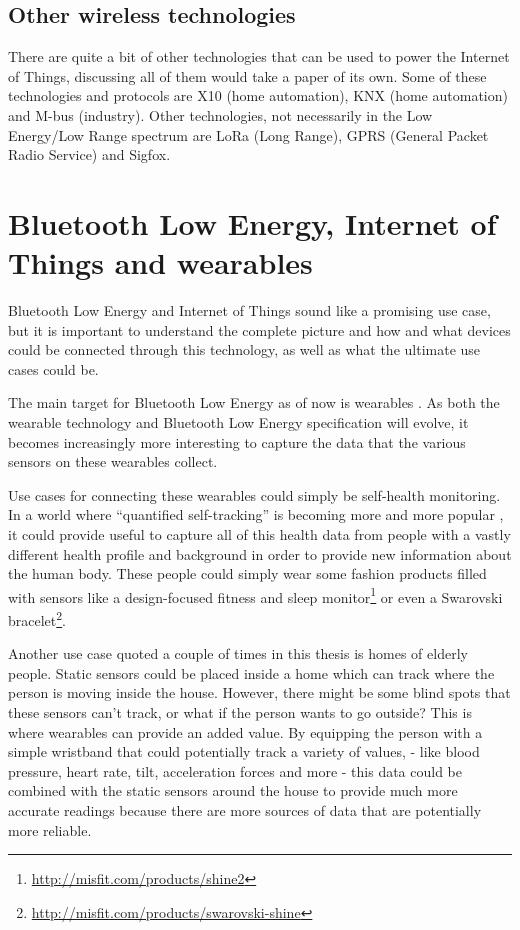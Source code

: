 \documentclass[pdftex,a4paper,12pt,twoside]{report}
\begin{document}
\subsection{Other wireless technologies}
\label{subsec:othertechnologies}
There are quite a bit of other technologies that can be used to power the Internet of Things, discussing all of them would take a paper of its own. Some of these technologies and protocols are X10 (home automation), KNX (home automation) and M-bus (industry). Other technologies, not necessarily in the Low Energy/Low Range spectrum are LoRa (Long Range), GPRS (General Packet Radio Service) and Sigfox.

\section{Bluetooth Low Energy, Internet of Things and wearables}
\label{sec:bleiotwearables}
Bluetooth Low Energy and Internet of Things sound like a promising use case, but it is important to understand the complete picture and how and what devices could be connected through this technology, as well as what the ultimate use cases could be.

The main target for Bluetooth Low Energy as of now is wearables \citep{blakesnow2016}. As both the wearable technology and Bluetooth Low Energy specification will evolve, it becomes increasingly more interesting to capture the data that the various sensors on these wearables collect.

Use cases for connecting these wearables could simply be self-health monitoring. In a world where ``quantified self-tracking'' is becoming more and more popular \citep{swan2012sensor}, it could provide useful to capture all of this health data from people with a vastly different health profile and background in order to provide new information about the human body. These people could simply wear some fashion products filled with sensors like a design-focused fitness and sleep monitor\footnote{\url{http://misfit.com/products/shine2}} or even a Swarovski bracelet\footnote{\url{http://misfit.com/products/swarovski-shine}}.

Another use case quoted a couple of times in this thesis is homes of elderly people. Static sensors could be placed inside a home which can track where the person is moving inside the house. However, there might be some blind spots that these sensors can't track, or what if the person wants to go outside? This is where wearables can provide an added value. By equipping the person with a simple wristband that could potentially track a variety of values, - like blood pressure, heart rate, tilt, acceleration forces and more - this data could be combined with the static sensors around the house to provide much more accurate readings because there are more sources of data that are potentially more reliable.
\end{document}
